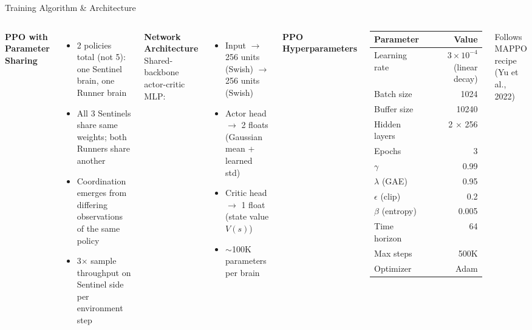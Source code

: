 \documentclass[aspectratio=169,11pt]{beamer}
\begin{document}
\begin{frame}{Training Algorithm \& Architecture}
\begin{columns}[T]
\textbf{PPO with Parameter Sharing}
\begin{itemize}
\item 2 policies total (not 5): one Sentinel brain, one Runner brain
\item All 3 Sentinels share same weights; both Runners share another
\item Coordination emerges from differing observations of the same policy
\item 3$\times$ sample throughput on Sentinel side per environment step
\end{itemize}

\vspace{4pt}
\textbf{Network Architecture}\\
Shared-backbone actor-critic MLP:
\begin{itemize}
\item Input $\rightarrow$ 256 units (Swish) $\rightarrow$ 256 units (Swish)
\item Actor head $\rightarrow$ 2 floats (Gaussian mean + learned std)
\item Critic head $\rightarrow$ 1 float (state value $V(s)$)
\item $\sim$100K parameters per brain
\end{itemize}

\textbf{PPO Hyperparameters}
\begin{tabular}{@{}lr@{}}
\toprule
Parameter & Value \\
\midrule
Learning rate & $3 \times 10^{-4}$ (linear decay) \\
Batch size & 1024 \\
Buffer size & 10240 \\
Hidden layers & 2 $\times$ 256 \\
Epochs & 3 \\
$\gamma$ & 0.99 \\
$\lambda$ (GAE) & 0.95 \\
$\epsilon$ (clip) & 0.2 \\
$\beta$ (entropy) & 0.005 \\
Time horizon & 64 \\
Max steps & 500K \\
Optimizer & Adam \\
\bottomrule
\end{tabular}

\vspace{2pt}
{\small Follows MAPPO recipe (Yu et al., 2022)}
\end{columns}
\end{frame}
\end{document}
